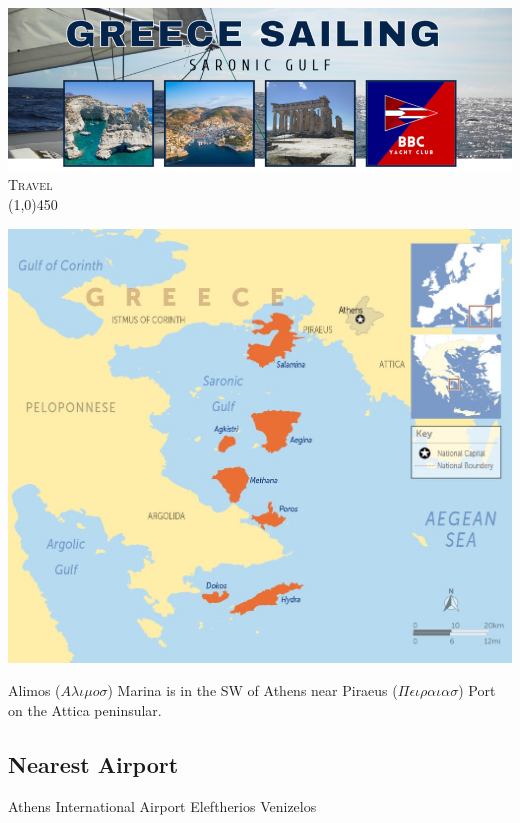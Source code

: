 \documentclass[12pt,a4paper,oneside]{article}
\begin{document}

\begin{center}
\includegraphics[scale=0.5]{../images/saronic_header_small.png} \\[0.2cm]
{\Huge \textsc{Travel}}\\
\line(1,0){450}
\end{center}


\begin{multicols}{2}

\noindent \includegraphics[scale=0.25]{saronic-map.jpg} 

\noindent Alimos ($ A\lambda\iota\mu o \sigma $) Marina is in the SW of Athens near Piraeus ($ \Pi\epsilon\iota\rho\alpha\iota\alpha\sigma $) Port on the Attica peninsular.

\subsection*{Nearest Airport}
Athens International Airport Eleftherios Venizelos


\end{multicols}
\end{document}
